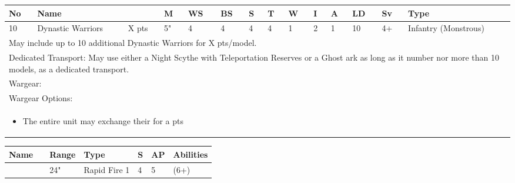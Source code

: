 

\noindent
\begin{tabular}{||m{10pt} m{95pt} m{30pt} m{11pt} m{11pt} m{11pt} m{11pt} m{11pt} m{11pt} m{11pt} m{11pt} m{11pt} m{11pt} m{125pt}||}
	\hline
	No & Name & & M & WS & BS & S & T & W & I & A & LD & Sv & Type \\
	\hline
	10 & Dynastic Warriors & X pts & 5" & 4 & 4 & 4 & 4 & 1 & 2 & 1 & 10 & 4+ & Infantry (Monstrous)\\
	\hline
	\hline
	\multicolumn{14}{||Z{532 pt}||}{May include up to 10 additional Dynastic Warriors for X pts/model.}\\	
	\multicolumn{14}{||Z{532 pt}||}{Dedicated Transport: May use either a Night Scythe with Teleportation Reserves or a Ghost ark as long as it number nor more than 10 models, as a dedicated transport.}\\	
	\hline
	\hline
	\multicolumn{14}{||Z{532 pt}||}{Wargear: \quickref{Gauss Flayer}}\\
	\multicolumn{14}{||Z{532 pt}||}{Wargear Options:} \\	\multicolumn{14}{||Z{532 pt}||}{\begin{itemize}
			\item The entire unit may exchange their \quickref{Gauss Flayer} for a \quickref{Gauss Reaper} \hrulefill 0 pts
	\end{itemize}} \\
	\hline
\end{tabular}

\noindent
\begin{tabular}{||m{110pt} m{30pt} m{31pt} m{55pt} m{12pt} m{12pt} m{210pt}||}
	\hline
	Name & & Range & Type & S & AP & Abilities \\
	\hline
	\quickref{Gauss Flayer} & & 24" & Rapid Fire 1 & 4 & 5 & \quickref{Gauss} (6+) \\
	\hline
\end{tabular}

